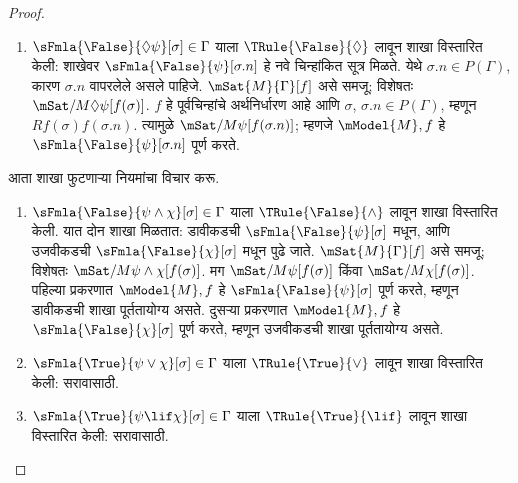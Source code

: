 \begin{proof}
\begin{enumerate}
  $\mSat{M}{\Diamond \psi}[f(\sigma)]$ असल्याने,
  $Rf(\sigma)w$ आणि $\mSat{M}{\psi}[w]$
  होईल असे $w \in W$ असते. $f'$ हे~$f$
  प्रमाणेच असू द्या, फक्त
  $f'(\sigma.n) = w$ असे ठरवा.
  $f'(\sigma) = f(\sigma)$ आणि
  $Rf(\sigma)w$ असल्याने
  $Rf'(\sigma)f'(\sigma.n)$.
  पूर्वचिन्हांच्या आरंभीच्या खंडांखालील बंदतेमुळे नव्या
  $\sigma.n$ पासून वाढवलेले कोणतेही पूर्वचिन्ह आधी वापरलेले
  नसते. त्यामुळे अर्थनिर्धारणासाठी तपासायची नवी जोडी फक्त
  $(\sigma,\sigma.n)$ हीच आहे; म्हणून $f'$
  हे $P(\Gamma) \cup \{\sigma.n\}$ चे
  अर्थनिर्धारण आहे. स्पष्टपणे
  $\mSat{M}{\psi}[f'(\sigma.n)]$.
  प्रत्येक $\sigma' \in P(\Gamma)$ साठी
  $f(\sigma') = f'(\sigma')$ असल्याने
  $\mSat{M}{\Gamma}[f']$. म्हणून
  $\mModel{M}, f'$ हे $\Gamma \cup
  \{\sFmla{\True}{\psi}[\sigma.n]\}$ पूर्ण करते.
\item $\sFmla{\False}{\Diamond \psi}[\sigma] \in \Gamma$
  याला
  $\TRule{\False}{\Diamond}$ लावून शाखा विस्तारित
  केली: शाखेवर
    $\sFmla{\False}{\psi}[\sigma.n]$ हे नवे
    चिन्हांकित सूत्र मिळते. येथे
    $\sigma.n \in P(\Gamma)$, कारण
    $\sigma.n$ वापरलेले असले पाहिजे.
    $\mSat{M}{\Gamma}[f]$ असे समजू; विशेषतः
    $\mSat/{M}{\Diamond \psi}[f(\sigma)]$.
    $f$ हे पूर्वचिन्हांचे अर्थनिर्धारण आहे आणि
    $\sigma$, $\sigma.n \in P(\Gamma)$,
    म्हणून $Rf(\sigma)f(\sigma.n)$.
    त्यामुळे $\mSat/{M}{\psi}[f(\sigma.n)]$;
    म्हणजे $\mModel{M}, f$ हे
    $\sFmla{\False}{\psi}[\sigma.n]$ पूर्ण करते.

\end{enumerate}
आता शाखा फुटणाऱ्या नियमांचा विचार करू.
\begin{enumerate}
\item $\sFmla{\False}{\psi \land \chi}[\sigma] \in \Gamma$
  याला
  $\TRule{\False}{\land}$ लावून शाखा विस्तारित
  केली. यात दोन शाखा मिळतात: डावीकडची
  $\sFmla{\False}{\psi}[\sigma]$ मधून, आणि
  उजवीकडची $\sFmla{\False}{\chi}[\sigma]$
  मधून पुढे जाते. $\mSat{M}{\Gamma}[f]$
  असे समजू; विशेषतः
  $\mSat/{M}{\psi \land \chi}[f(\sigma)]$.
  मग $\mSat/{M}{\psi}[f(\sigma)]$ किंवा
  $\mSat/{M}{\chi}[f(\sigma)]$.
  पहिल्या प्रकरणात $\mModel{M}, f$ हे
  $\sFmla{\False}{\psi}[\sigma]$ पूर्ण करते,
  म्हणून डावीकडची शाखा पूर्ततायोग्य असते.
  दुसऱ्या प्रकरणात $\mModel{M}, f$ हे
  $\sFmla{\False}{\chi}[\sigma]$ पूर्ण करते,
  म्हणून उजवीकडची शाखा पूर्ततायोग्य असते.
\item $\sFmla{\True}{\psi \lor \chi}[\sigma] \in \Gamma$
  याला
  $\TRule{\True}{\lor}$ लावून शाखा विस्तारित
  केली: सरावासाठी.
\item $\sFmla{\True}{\psi \lif \chi}[\sigma] \in \Gamma$
  याला
  $\TRule{\True}{\lif}$ लावून शाखा विस्तारित
  केली: सरावासाठी.
\end{enumerate}
\end{proof}


